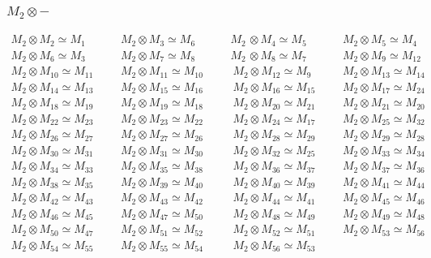\subsubsection{$M_2\otimes -$}
\begin{align*}
M_{2} \otimes M_{2} \simeq M_{1} &&& M_{2} \otimes M_{3} \simeq M_{6} &&& M_{2\
} \otimes M_{4} \simeq M_{5} &&& M_{2} \otimes M_{5} \simeq M_{4}\\
M_{2} \otimes M_{6} \simeq M_{3} &&& M_{2} \otimes M_{7} \simeq M_{8} &&& M_{2\
} \otimes M_{8} \simeq M_{7} &&& M_{2} \otimes M_{9} \simeq M_{12}\\
M_{2} \otimes M_{10} \simeq M_{11} &&& M_{2} \otimes M_{11} \simeq M_{10} &&& \
M_{2} \otimes M_{12} \simeq M_{9} &&& M_{2} \otimes M_{13} \simeq M_{14}\\
M_{2} \otimes M_{14} \simeq M_{13} &&& M_{2} \otimes M_{15} \simeq M_{16} &&& \
M_{2} \otimes M_{16} \simeq M_{15} &&& M_{2} \otimes M_{17} \simeq M_{24}\\
M_{2} \otimes M_{18} \simeq M_{19} &&& M_{2} \otimes M_{19} \simeq M_{18} &&& \
M_{2} \otimes M_{20} \simeq M_{21} &&& M_{2} \otimes M_{21} \simeq M_{20}\\
M_{2} \otimes M_{22} \simeq M_{23} &&& M_{2} \otimes M_{23} \simeq M_{22} &&& \
M_{2} \otimes M_{24} \simeq M_{17} &&& M_{2} \otimes M_{25} \simeq M_{32}\\
M_{2} \otimes M_{26} \simeq M_{27} &&& M_{2} \otimes M_{27} \simeq M_{26} &&& \
M_{2} \otimes M_{28} \simeq M_{29} &&& M_{2} \otimes M_{29} \simeq M_{28}\\
M_{2} \otimes M_{30} \simeq M_{31} &&& M_{2} \otimes M_{31} \simeq M_{30} &&& \
M_{2} \otimes M_{32} \simeq M_{25} &&& M_{2} \otimes M_{33} \simeq M_{34}\\
M_{2} \otimes M_{34} \simeq M_{33} &&& M_{2} \otimes M_{35} \simeq M_{38} &&& \
M_{2} \otimes M_{36} \simeq M_{37} &&& M_{2} \otimes M_{37} \simeq M_{36}\\
M_{2} \otimes M_{38} \simeq M_{35} &&& M_{2} \otimes M_{39} \simeq M_{40} &&& \
M_{2} \otimes M_{40} \simeq M_{39} &&& M_{2} \otimes M_{41} \simeq M_{44}\\
M_{2} \otimes M_{42} \simeq M_{43} &&& M_{2} \otimes M_{43} \simeq M_{42} &&& \
M_{2} \otimes M_{44} \simeq M_{41} &&& M_{2} \otimes M_{45} \simeq M_{46}\\
M_{2} \otimes M_{46} \simeq M_{45} &&& M_{2} \otimes M_{47} \simeq M_{50} &&& \
M_{2} \otimes M_{48} \simeq M_{49} &&& M_{2} \otimes M_{49} \simeq M_{48}\\
M_{2} \otimes M_{50} \simeq M_{47} &&& M_{2} \otimes M_{51} \simeq M_{52} &&& \
M_{2} \otimes M_{52} \simeq M_{51} &&& M_{2} \otimes M_{53} \simeq M_{56}\\
M_{2} \otimes M_{54} \simeq M_{55} &&& M_{2} \otimes M_{55} \simeq M_{54} &&& \
M_{2} \otimes M_{56} \simeq M_{53}\\
\end{align*}

